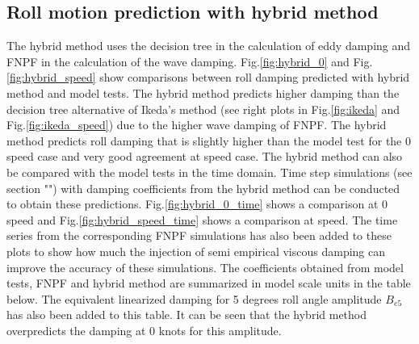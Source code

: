 \subsection*{Roll motion prediction with hybrid
method}\label{roll-motion-prediction-with-hybrid-method}
The hybrid method uses the decision tree in the calculation of eddy
damping and FNPF in the calculation of the wave damping.
Fig.\ref{fig:hybrid_0} and Fig.\ref{fig:hybrid_speed}
show comparisons between roll damping predicted with hybrid method and
model tests. The hybrid method predicts higher damping than the decision
tree alternative of Ikeda's method (see right plots in
Fig.\ref{fig:ikeda} and Fig.\ref{fig:ikeda_speed}) due
to the higher wave damping of FNPF. The hybrid method predicts roll
damping that is slightly higher than the model test for the 0 speed case
and very good agreement at speed case.
The hybrid method can also be compared with the model tests in the time
domain. Time step simulations (see section "") with
damping coefficients from the hybrid method can be conducted to obtain
these predictions. Fig.\ref{fig:hybrid_0_time} shows a
comparison at 0 speed and Fig.\ref{fig:hybrid_speed_time} shows
a comparison at speed. The time series from the corresponding FNPF
simulations has also been added to these plots to show how much the
injection of semi empirical viscous damping can improve the accuracy of
these simulations.
The coefficients obtained from model tests, FNPF and hybrid method are
summarized in model scale units in the table below. The equivalent
linearized damping for 5 degrees roll angle amplitude $B_{e5}$ has
also been added to this table. It can be seen that the hybrid method
overpredicts the damping at 0 knots for this amplitude.
